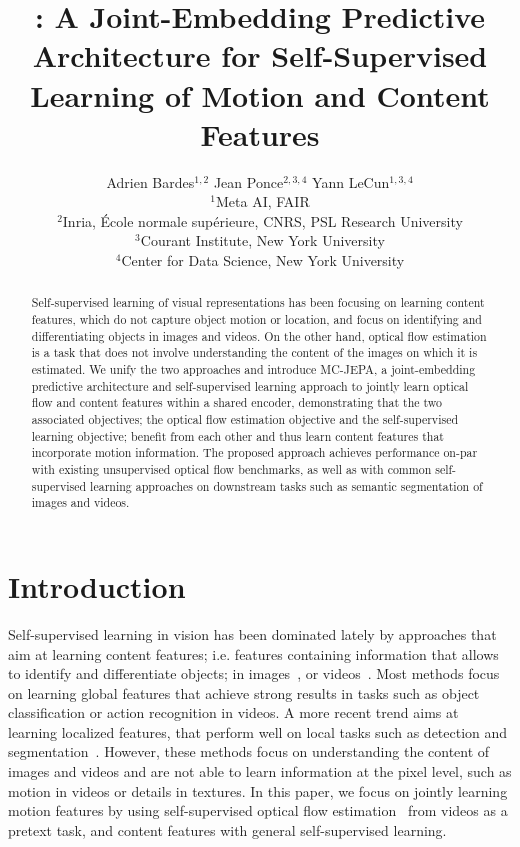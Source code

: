 \documentclass{article} %
\title{\algo: A Joint-Embedding Predictive Architecture for Self-Supervised Learning of Motion and Content Features}
\author{
    Adrien Bardes$^{1,2}$ \And Jean Ponce$^{2,3,4}$ \And Yann LeCun$^{1,3,4}$ \AND
    \begin{tabular}{l}
        $^1$\normalfont Meta AI, FAIR\\
        $^2$\normalfont Inria, École normale supérieure, CNRS, PSL Research University \\
        $^3$\normalfont Courant Institute, New York University\\
        $^4$\normalfont Center for Data Science, New York University\\
    \end{tabular}
}
\newcommand{\algo}{MC-JEPA}
\begin{document}
\maketitle

\begin{abstract}
Self-supervised learning of visual representations has been focusing on learning content features, which do not capture object motion or location, and focus on identifying and differentiating objects in images and videos. On the other hand, optical flow estimation is a task that does not involve understanding the content of the images on which it is estimated. We unify the two approaches and introduce \algo, a joint-embedding predictive architecture and self-supervised learning approach to jointly learn optical flow and content features within a shared encoder, demonstrating that the two associated objectives; the optical flow estimation objective and the self-supervised learning objective; benefit from each other and thus learn content features that incorporate motion information. The proposed approach achieves performance on-par with existing unsupervised optical flow benchmarks, as well as with common self-supervised learning approaches on downstream tasks such as semantic segmentation of images and videos.
\end{abstract}


\section{Introduction}

Self-supervised learning in vision has been dominated lately by approaches that aim at learning content features; i.e. features containing information that allows to identify and differentiate objects; in images~\citep{chen2020simclr, grill2020byol, chen2020simsiam, zbontar2021barlow, bardes2022vicreg, caron2020swav, caron2021dino, zhou2022ibot, assran2022msn, assran2023ijepa}, or videos~\citep{qian2021cvrl, recasens2021brave, feichtenhofer2021rbyol, tong2022videomae}. Most methods focus on learning global features that achieve strong results in tasks such as object classification or action recognition in videos. A more recent trend aims at learning localized features, that perform well on local tasks such as detection and segmentation~\citep{xiao2021resim, wang2021densecl, henaff2021detcon, henaff2022odin, bardes2022vicregl}. However, these methods focus on understanding the content of images and videos and are not able to learn information at the pixel level, such as motion in videos or details in textures. In this paper, we focus on jointly learning motion features by using self-supervised optical flow estimation~\citep{horn1981flow} from videos as a pretext task, and content features with general self-supervised learning.
\end{document}
